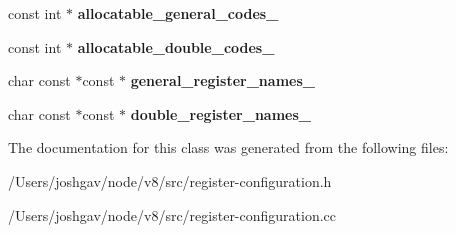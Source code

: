 \begin{DoxyCompactItemize}
\item 
const int $\ast$ {\bfseries allocatable\+\_\+general\+\_\+codes\+\_\+}\hypertarget{classv8_1_1internal_1_1_register_configuration_a820017b51bfd1f69077466c073d541f4}{}\label{classv8_1_1internal_1_1_register_configuration_a820017b51bfd1f69077466c073d541f4}

\item 
const int $\ast$ {\bfseries allocatable\+\_\+double\+\_\+codes\+\_\+}\hypertarget{classv8_1_1internal_1_1_register_configuration_a959b37334b7d9600e59f8f85221a2ee1}{}\label{classv8_1_1internal_1_1_register_configuration_a959b37334b7d9600e59f8f85221a2ee1}

\item 
char const $\ast$const $\ast$ {\bfseries general\+\_\+register\+\_\+names\+\_\+}\hypertarget{classv8_1_1internal_1_1_register_configuration_a1c8bfffb52352fdf4d2d67d058c9b723}{}\label{classv8_1_1internal_1_1_register_configuration_a1c8bfffb52352fdf4d2d67d058c9b723}

\item 
char const $\ast$const $\ast$ {\bfseries double\+\_\+register\+\_\+names\+\_\+}\hypertarget{classv8_1_1internal_1_1_register_configuration_a3f35febfdae0b8b9afc1bb9ff1620fd9}{}\label{classv8_1_1internal_1_1_register_configuration_a3f35febfdae0b8b9afc1bb9ff1620fd9}

\end{DoxyCompactItemize}


The documentation for this class was generated from the following files\+:\begin{DoxyCompactItemize}
\item 
/\+Users/joshgav/node/v8/src/register-\/configuration.\+h\item 
/\+Users/joshgav/node/v8/src/register-\/configuration.\+cc\end{DoxyCompactItemize}
